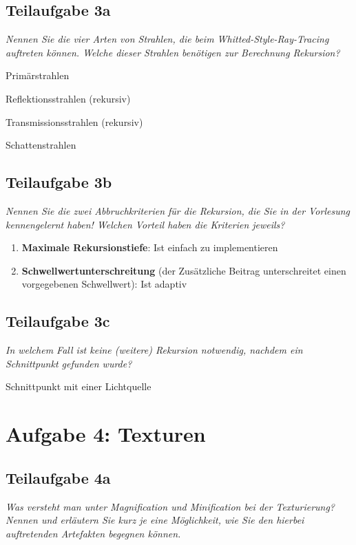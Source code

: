 \documentclass[a4paper]{scrartcl}
\begin{document}
\subsection*{Teilaufgabe 3a}
\textit{Nennen Sie die vier Arten von Strahlen, die beim
Whitted-Style-Ray-Tracing auftreten können. Welche dieser Strahlen benötigen
zur Berechnung Rekursion?}

\begin{enumerate*}[label=(\arabic*)]
    \item Primärstrahlen
    \item Reflektionsstrahlen (rekursiv)
    \item Transmissionsstrahlen (rekursiv)
    \item Schattenstrahlen
\end{enumerate*}

\clearpage
\subsection*{Teilaufgabe 3b}
\textit{Nennen Sie die zwei Abbruchkriterien für die Rekursion, die Sie in der
Vorlesung kennengelernt haben! Welchen Vorteil haben die Kriterien jeweils?}
\begin{enumerate}[label=(\arabic*)]
    \item \textbf{Maximale Rekursionstiefe}: Ist einfach zu implementieren
    \item \textbf{Schwellwertunterschreitung} (der Zusätzliche Beitrag
    unterschreitet einen vorgegebenen Schwellwert): Ist adaptiv
\end{enumerate}

\subsection*{Teilaufgabe 3c}
\textit{In welchem Fall ist keine (weitere) Rekursion notwendig, nachdem ein
Schnittpunkt gefunden wurde?}

Schnittpunkt mit einer Lichtquelle


\section*{Aufgabe 4: Texturen}
\subsection*{Teilaufgabe 4a}
\textit{Was versteht man unter Magnification und Minification bei der Texturierung? Nennen
und erläutern Sie kurz je eine Möglichkeit, wie Sie den hierbei auftretenden Artefakten
begegnen können.}
\end{document}
